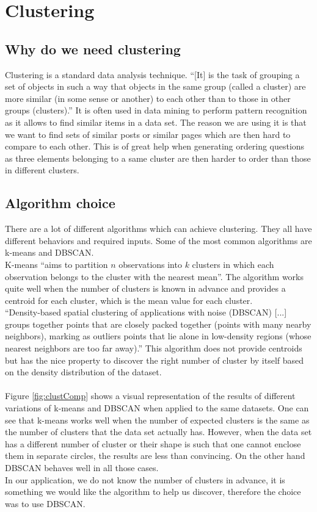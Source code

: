 \section{Clustering}
\subsection{Why do we need clustering}
Clustering is a standard data analysis technique. ``[It] is the task of grouping a set of objects in such a way that objects in the same group (called a cluster) are more similar (in some sense or another) to each other than to those in other groups (clusters).''\cite{clustering} It is often used in data mining to perform pattern recognition as it allows to find similar items in a data set. The reason we are using it is that we want to find sets of similar posts or similar pages which are then hard to compare to each other. This is of great help when generating ordering questions as three elements belonging to a same cluster are then harder to order than those in different clusters.
\subsection{Algorithm choice}
There are a lot of different algorithms which can achieve clustering. They all have different behaviors and required inputs. Some of the most common algorithms are k-means and DBSCAN.\\
K-means ``aims to partition $n$ observations into $k$ clusters in which each observation belongs to the cluster with the nearest mean''\cite{kmeans}. The algorithm works quite well when the number of clusters is known in advance and provides a centroid for each cluster, which is the mean value for each cluster.\\
``Density-based spatial clustering of applications with noise (DBSCAN) [...] groups together points that are closely packed together (points with many nearby neighbors), marking as outliers points that lie alone in low-density regions (whose nearest neighbors are too far away).''\cite{dbscan} This algorithm does not provide centroids but has the nice property to discover the right number of cluster by itself based on the density distribution of the dataset.\\\\
Figure \ref{fig:clustComp} shows a visual representation of the results of different variations of k-means and DBSCAN when applied to the same datasets. One can see that k-means works well when the number of expected clusters is the same as the number of clusters that the data set actually has. However, when the data set has a different number of cluster or their shape is such that one cannot enclose them in separate circles, the results are less than convincing. On the other hand DBSCAN behaves well in all those cases.\\
In our application, we do not know the number of clusters in advance, it is something we would like the algorithm to help us discover, therefore the choice was to use DBSCAN.

